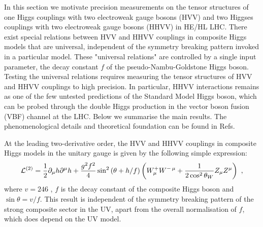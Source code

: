 
In this section we motivate precision measurements on the tensor structures of one Higgs couplings with two electroweak gauge bosons (HVV) and two Higgses couplings with two electroweak gauge bosons (HHVV) in HE/HL LHC. There exist special relations between HVV and HHVV couplings in composite Higgs models that are universal, independent of the  symmetry breaking pattern invoked in a particular model. These "universal relations" are controlled by a single input parameter, the decay constant $f$ of the pseudo-Nambu-Goldstone Higgs boson. Testing the universal relations requires measuring the tensor structures of HVV and HHVV couplings to high precision.  In particular,  HHVV interactions remains as one of the few untested predictions of the Standard Model Higgs boson, which can be probed through the double Higgs production in the vector boson fusion (VBF) channel at the LHC. Below we summarise the main results. The phenomenological details and theoretical foundation can be found in Refs.~\cite{Low:2014nga,Low:2014oga,Liu:2018vel,Liu:2018qtb}



At the leading two-derivative order, the HVV and HHVV couplings in composite Higgs models in the unitary gauge is given by the following simple expression:
\begin{equation}
\label{eq:twod}
{\cal L}^{(2)} = \frac12 \partial_\mu h\partial^\mu h+\frac{g^2f^2}{4}\sin^2\left(\theta+h/f\right)\left(W_\mu^+W^{-\, \mu}+\frac1{2\cos^2\theta_W}Z_\mu Z^\mu\right)\ ,
\end{equation}
where  $v=246$ \UGeV, $f$ is the decay constant of the composite Higgs boson and $\sin\theta=v/f$. This result is independent of the symmetry breaking pattern of the strong composite sector in the UV, apart from the overall normalisation of $f$, which does depend on the UV model.

